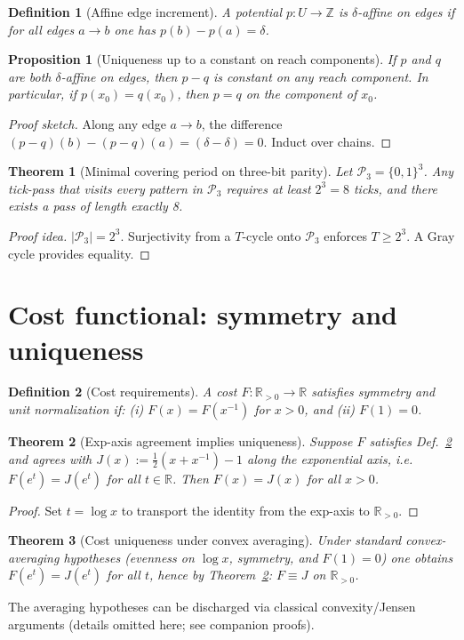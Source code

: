 \documentclass[11pt,letterpaper]{article}
\newtheorem{definition}{Definition}
\newtheorem{theorem}{Theorem}
\newtheorem{proposition}{Proposition}
\begin{document}
\begin{definition}[Affine edge increment]
A potential $p:U\to\mathbb Z$ is $\delta$-affine on edges if for all edges $a\to b$ one has $p(b)-p(a)=\delta$.
\end{definition}
\begin{proposition}[Uniqueness up to a constant on reach components]\label{prop:unique}
If $p$ and $q$ are both $\delta$-affine on edges, then $p{-}q$ is constant on any reach component. In particular, if $p(x_0){=}q(x_0)$, then $p{=}q$ on the component of $x_0$.
\end{proposition}
\begin{proof}[Proof sketch]
Along any edge $a\to b$, the difference $(p{-}q)(b)-(p{-}q)(a)=(\delta{-}\delta)=0$. Induct over chains.
\end{proof}

\begin{theorem}[Minimal covering period on three-bit parity]\label{thm:eight}
Let $\mathcal P_3=\{0,1\}^{3}$. Any tick-pass that visits every pattern in $\mathcal P_3$ requires at least $2^3{=}8$ ticks, and there exists a pass of length exactly 8.
\end{theorem}
\begin{proof}[Proof idea]
$|\mathcal P_3|=2^3$. Surjectivity from a $T$-cycle onto $\mathcal P_3$ enforces $T\ge2^3$. A Gray cycle provides equality.
\end{proof}

\section{Cost functional: symmetry and uniqueness}
\begin{definition}[Cost requirements]\label{def:cost}
A cost $F: \mathbb R_{>0}\to\mathbb R$ satisfies symmetry and unit normalization if: (i) $F(x)=F(x^{-1})$ for $x{>}0$, and (ii) $F(1)=0$.
\end{definition}
\begin{theorem}[Exp-axis agreement implies uniqueness]\label{thm:exp}
Suppose $F$ satisfies Def.~\ref{def:cost} and agrees with $J(x):=\tfrac12(x+x^{-1})-1$ along the exponential axis, i.e. $F(e^t)=J(e^t)$ for all $t\in\mathbb R$. Then $F(x)=J(x)$ for all $x{>}0$.
\end{theorem}
\begin{proof}
Set $t=\log x$ to transport the identity from the exp-axis to $\mathbb R_{>0}$.
\end{proof}
\begin{theorem}[Cost uniqueness under convex averaging]\label{thm:cost}
Under standard convex-averaging hypotheses (evenness on $\log x$, symmetry, and $F(1){=}0$) one obtains $F(e^t)=J(e^t)$ for all $t$, hence by Theorem~\ref{thm:exp}: $F\equiv J$ on $\mathbb R_{>0}$.
\end{theorem}
\noindent
The averaging hypotheses can be discharged via classical convexity/Jensen arguments (details omitted here; see companion proofs).
\end{document}
